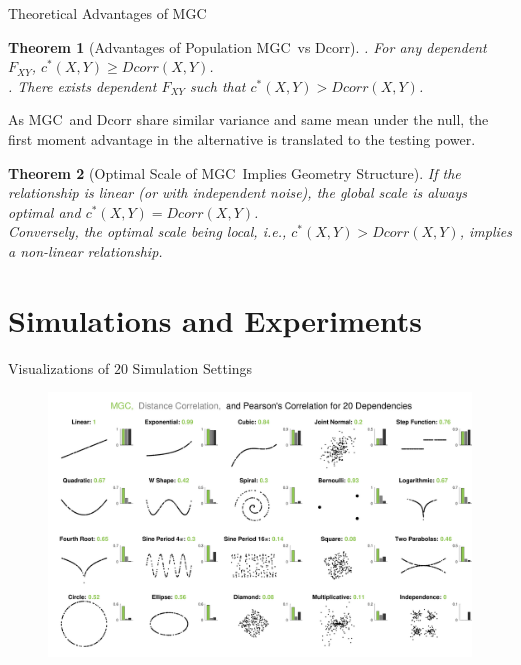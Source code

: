 \documentclass[mathserif,t]{beamer}
\newtheorem{thm}{Theorem}
\newcommand{\Mgc}{MGC}
\newcommand{\mbx}{X}
\newcommand{\mby}{Y}
\begin{document}
\begin{frame}{Theoretical Advantages of \Mgc}
\begin{thm}[Advantages of Population \Mgc~vs Dcorr]
. For any dependent $F_{XY}$, $c^{*}(X,Y) \geq Dcorr(X,Y)$. \\
\pause
{}. There exists dependent $F_{XY}$ such that $c^{*}(X,Y)>Dcorr(X,Y)$.\\
\end{thm}
\pause
As \Mgc~and Dcorr share similar variance and same mean under the null, the first moment advantage in the alternative is translated to the testing power. 
\pause
\begin{thm}[Optimal Scale of \Mgc~Implies Geometry Structure]
\pause
If the relationship is linear (or with independent noise), the global scale is always optimal and $c^{*}(X,Y)=Dcorr(X,Y)$.\\
\pause
\medskip
Conversely, the optimal scale being local, i.e., $c^{*}(X,Y)>Dcorr(X,Y)$, implies a non-linear relationship.
\end{thm}
\end{frame}

\section{Simulations and Experiments}
\begin{frame}{Visualizations of $20$ Simulation Settings}
\pause
\begin{figure}[ht]
  \centering
  \includegraphics[width=1.0\textwidth]{FigSimVisual2}
	\label{f:dependencies}
\end{figure}
\end{frame}
\end{document}
